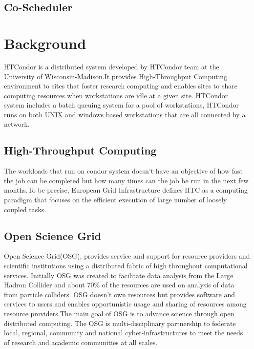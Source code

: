 \documentclass[ms,electronic,double]{nuthesis}
\begin{document}
\section{Co-Scheduler}


\chapter{Background}
HTCondor is a distributed system developed by HTCondor team at the University of 
Wisconsin-Madison.It provides High-Throughput Computing environment to sites 
that foster research computing and enables sites to share computing resources when 
workstations are idle at a given site. HTCondor system includes a batch queuing 
system for a pool of workstations, HTCondor runs on both UNIX and windows based 
workstations that are all connected by a network. 

\section{High-Throughput Computing} The workloads that run on 
condor system doesn't have an objective of  how fast the job can be completed but how many 
times can the job be run in the next few months.To be precise, European Grid 
Infrastructure defines HTC as a computing paradigm that focuses on the efficient 
execution of large number of loosely coupled tasks.

\section{Open Science Grid} Open Science Grid(OSG), provides service and support 
for resource providers and scientific institutions using a distributed fabric of 
high throughout computational services. Initially OSG was created to facilitate data analysis from the 
Large Hadron Collider and about 70\% of the resources are used on analysis of data from particle colliders.
OSG doesn't own resources but provides software and services to users and enables opportunistic usage and  sharing of resources among
resource providers.The main goal of OSG is to advance science through open 
distributed computing. The OSG is multi-disciplinary partnership to federate 
local, regional, community and national cyber-infrastructures to meet the needs 
of research and academic communities at all scales. 



\backmatter

\appendix




\nocite{*}

\end{document}
